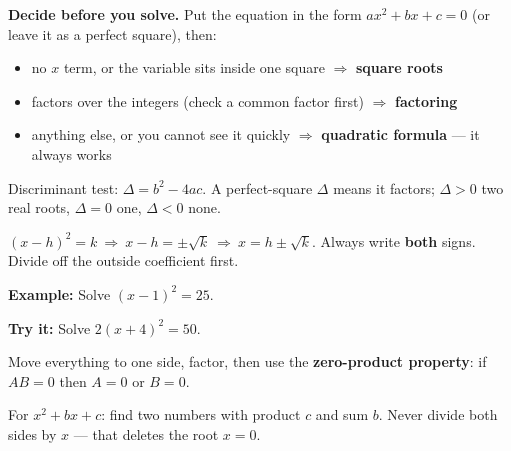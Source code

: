 \documentclass[12pt]{article}
\begin{document}

\begin{formulabox}
\textbf{Decide before you solve.} Put the equation in the form
$ax^2 + bx + c = 0$ (or leave it as a perfect square), then:\par
\begin{itemize}[leftmargin=0.6cm, itemsep=0pt, topsep=2pt]
  \item no $x$ term, or the variable sits inside one square $\Rightarrow$
        \textbf{square roots}
  \item factors over the integers (check a common factor first) $\Rightarrow$
        \textbf{factoring}
  \item anything else, or you cannot see it quickly $\Rightarrow$
        \textbf{quadratic formula} --- it always works
\end{itemize}
Discriminant test: $\Delta = b^2 - 4ac$. A perfect-square $\Delta$ means it
factors; $\Delta > 0$ two real roots, $\Delta = 0$ one, $\Delta < 0$ none.
\end{formulabox}


\begin{formulabox}
$(x - h)^2 = k \ \Rightarrow\ x - h = \pm\sqrt{k} \ \Rightarrow\ x = h \pm \sqrt{k}$.
\quad Always write \textbf{both} signs. Divide off the outside coefficient first.
\end{formulabox}

\begin{examplebox}
\textbf{Example:} \quad Solve $(x - 1)^2 = 25$.
\end{examplebox}

\begin{tryitbox}
\textbf{Try it:} \quad Solve $2(x + 4)^2 = 50$.\\[2pt]
\end{tryitbox}


\begin{formulabox}
Move everything to one side, factor, then use the \textbf{zero-product
property}: if $AB = 0$ then $A = 0$ or $B = 0$.\par
For $x^2 + bx + c$: find two numbers with product $c$ and sum $b$.
Never divide both sides by $x$ --- that deletes the root $x = 0$.
\end{formulabox}
\end{document}
